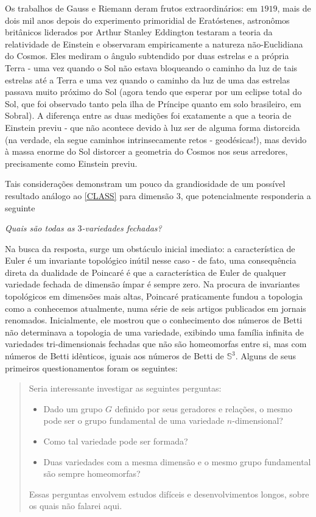 Os trabalhos de Gauss e Riemann deram frutos extraordinários: em $1919$, mais de dois mil anos depois do experimento primoridial de Eratóstenes, astronômos britânicos liderados por Arthur Stanley Eddington testaram a teoria da relatividade de Einstein e observaram empiricamente a natureza não-Euclidiana do Cosmos. Eles mediram o ângulo subtendido por duas estrelas e a própria Terra - uma vez quando o Sol não estava bloqueando o caminho da luz de tais estrelas até a Terra e uma vez quando o caminho da luz de uma das estrelas passava muito próximo do Sol (agora tendo que esperar por um eclipse total do Sol, que foi observado tanto pela ilha de Príncipe quanto em solo brasileiro, em Sobral). A diferença entre as duas medições foi exatamente a que a teoria de Einstein previu - que não acontece devido à luz ser de alguma forma distorcida (na verdade, ela segue caminhos intrinsecamente retos - geodésicas!), mas devido à massa enorme do Sol distorcer a geometria do Cosmos nos seus arredores,  precisamente como Einstein previu. \par 
Tais considerações demonstram um pouco da grandiosidade de um possível resultado análogo ao \cref{CLASS} para dimensão $3$, que potencialmente responderia a seguinte
\begin{pergunta}\label{perg1}
\emph{Quais são todas as $3$-variedades fechadas?}
\end{pergunta}
Na busca da resposta, surge um obstáculo inicial imediato: a característica de Euler é um invariante topológico inútil nesse caso - de fato, uma consequência direta da dualidade de Poincaré é que a característica de Euler de qualquer variedade fechada de dimensão ímpar é sempre zero. Na procura de invariantes topológicos em dimensões mais altas, Poincaré praticamente fundou a topologia como a conhecemos atualmente, numa série de seis artigos publicados em jornais renomados. Inicialmente, ele mostrou que o conhecimento dos números de Betti não determinava a topologia de uma variedade, exibindo uma família infinita de variedades tri-dimensionais fechadas que não são homeomorfas entre si, mas com números de Betti idênticos, iguais aos números de Betti de $\mathbb{S}^3$. Alguns de seus primeiros questionamentos foram os seguintes:
\blockquote{
Seria interessante investigar as seguintes perguntas:
\begin{itemize}
\item Dado um grupo $G$ definido por seus geradores e relações, o mesmo pode ser o grupo fundamental de uma variedade $n$-dimensional? 
\item Como tal variedade pode ser formada? 
\item Duas variedades com a mesma dimensão e o mesmo grupo fundamental são sempre homeomorfas? 
\end{itemize}
Essas perguntas envolvem estudos difíceis e desenvolvimentos longos, sobre os quais não falarei aqui.
}
